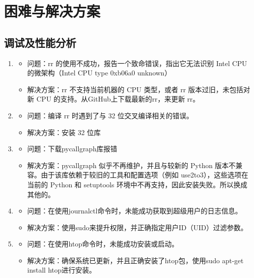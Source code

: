 \documentclass[UTF8]{ctexart}
\begin{document}
 \section{困难与解决方案}
 \subsection{调试及性能分析}

\begin{enumerate}
 \item \begin{itemize}
 \item 问题：rr 的使用不成功，报告一个致命错误，指出它无法识别 Intel CPU 的微架构（Intel CPU type 0xb06a0 unknown）
 \item 解决方案：rr 不支持当前机器的 CPU 类型，或者 rr 版本过旧，未包括对新 CPU 的支持。从GitHub上下载最新的rr，来更新 rr。
 \end{itemize}

\item \begin{itemize}
 \item 问题：编译 rr 时遇到了与 32 位交叉编译相关的错误。
 \item 解决方案：安装 32 位库
 \end{itemize} 

\item \begin{itemize} 
\item 问题：下载pycallgraph库报错 
 \item 解决方案：pycallgraph 似乎不再维护，并且与较新的 Python 版本不兼容。由于该库依赖于较旧的工具和配置选项（例如 use2to3），这些选项在当前的 Python 和 setuptools 环境中不再支持，因此安装失败。所以换成其他的。
 \end{itemize} 
\item \begin{itemize}
 \item 问题：在使用journalctl命令时，未能成功获取到超级用户的日志信息。
\item 解决方案：使用sudo来提升权限，并正确指定用户ID（UID）过滤参数。
 \end{itemize}\item \begin{itemize}
\item 问题：在使用htop命令时，未能成功安装或启动。
\item 解决方案：确保系统已更新，并且正确安装了htop包，使用sudo apt-get install htop进行安装。
\end{itemize} \end{enumerate}
\end{document}
